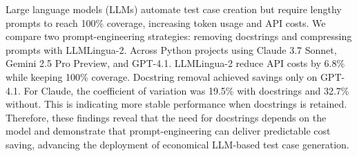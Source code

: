 

Large language models (LLMs) automate test case creation but require lengthy prompts to reach 100\% coverage, increasing token usage and API costs. We compare two prompt-engineering strategies: removing docstrings and compressing prompts with LLMLingua-2. Across Python projects using Claude 3.7 Sonnet, Gemini 2.5 Pro Preview, and GPT-4.1. LLMLingua-2 reduce API costs by 6.8\% while keeping 100\% coverage. Docstring removal achieved savings only on GPT-4.1. For Claude, the coefficient of variation was 19.5\% with docstrings and 32.7\% without. This is indicating more stable performance when docstrings is retained. Therefore, these findings reveal that the need for docstrings depends on the model and demonstrate that prompt-engineering can deliver predictable cost saving, advancing the deployment of economical LLM-based test case generation.

